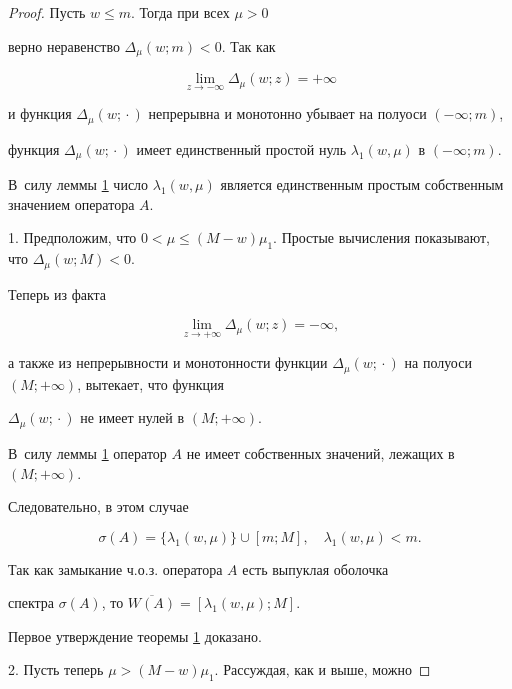 \begin{proof} Пусть $w \leq m$. Тогда при всех $\mu>0$

верно неравенство $\Delta_{\mu}(w; m)<0$. Так как

$$

\lim\limits_{z \to -\infty} \Delta_{\mu}(w; z)=+\infty

$$

и функция $\Delta_{\mu}(w; {}\cdot{})$ непрерывна и монотонно убывает на полуоси $(-\infty; m)$, 

функция $\Delta_{\mu}(w; {}\cdot{})$ имеет единственный простой нуль $\lambda_1(w, \mu)$ в $(-\infty; m)$. 

В~силу леммы \hyperlink{RD:lemma1}{1} число $\lambda_1(w, \mu)$ является единственным простым собственным значением оператора $A$.



\smallskip



1. Предположим, что $0< \mu \leq (M-w) \mu_1$. Простые вычисления показывают, что $\Delta_{\mu}(w; M)<0$. 

Теперь из факта

$$

\lim\limits_{z \to +\infty} \Delta_{\mu}(w; z)=-\infty,

$$

а также из непрерывности и монотонности функции $\Delta_{\mu}(w; {}\cdot{})$ на полуоси $(M; +\infty)$, вытекает, что функция

$\Delta_{\mu}(w; {}\cdot{})$ не имеет нулей в $(M; +\infty)$. 

В~силу леммы \hyperlink{RD:lemma1}{1} оператор $A$ не имеет собственных значений, лежащих в $(M; +\infty)$. 

Следовательно, в этом случае 

$$

\sigma(A)=\{ \lambda_1(w, \mu) \}\cup [m; M], \quad \lambda_1(w,

\mu)<m.

$$

Так как замыкание ч.о.з. оператора $A$ есть выпуклая оболочка

спектра $\sigma(A)$, то $\overline{W(A)}=[\lambda_1(w, \mu); M]$.

Первое утверждение теоремы \hyperlink{RD:th1}{1} доказано.



\smallskip



2. Пусть теперь $\mu > (M-w) \mu_1$. Рассуждая, как и выше, можно


\end{proof}

